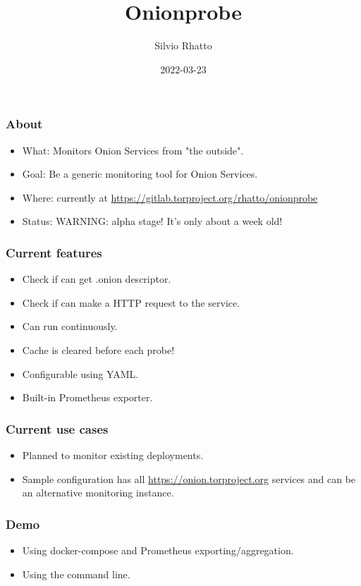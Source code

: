 \documentclass[aspectratio=169,12pt]{beamer}
\title{Onionprobe}
\author{Silvio Rhatto}
\date{2022-03-23}
\institute{}
\begin{document}
\begin{frame}
    \titlepage
\end{frame}

\begin{frame}
  \frametitle{About}
  \begin{itemize}
    \item What: Monitors Onion Services from "the outside".

    \item Goal: Be a generic monitoring tool for Onion Services.

    \item Where: currently at
          \href{https://gitlab.torproject.org/rhatto/onionprobe/}{https://gitlab.torproject.org/rhatto/onionprobe}

    \item Status: WARNING: alpha stage! It's only about a week old!
  \end{itemize}
\end{frame}

\begin{frame}
  \frametitle{Current features}

  \begin{itemize}
    \item Check if can get .onion descriptor.
    \item Check if can make a HTTP request to the service.
    \item Can run continuously.
    \item Cache is cleared before each probe!
    \item Configurable using YAML.
    \item Built-in Prometheus exporter.
  \end{itemize}
\end{frame}

\begin{frame}
  \frametitle{Current use cases}

  \begin{itemize}
    \item
      Planned to monitor existing deployments.
    \item
      Sample configuration has all
      \href{https://onion.torproject.org}{https://onion.torproject.org}
      services and can be an alternative monitoring instance.
  \end{itemize}
\end{frame}

\begin{frame}
  \frametitle{Demo}

  \begin{itemize}
    \item Using docker-compose and Prometheus exporting/aggregation.
    \item Using the command line.
  \end{itemize}
\end{frame}
\end{document}
